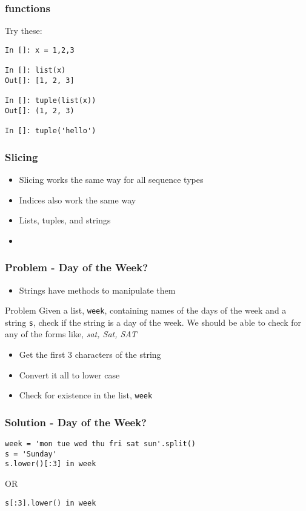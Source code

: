 \documentclass[14pt,compress]{beamer}
\begin{document}
\begin{frame}[fragile]
  \frametitle{ functions}
  Try these:
\begin{lstlisting}
In []: x = 1,2,3

In []: list(x)
Out[]: [1, 2, 3]

In []: tuple(list(x))
Out[]: (1, 2, 3)

In []: tuple('hello')
\end{lstlisting}
\end{frame}

\begin{frame}
  \frametitle{Slicing}
  \begin{itemize}
  \item Slicing works the same way for all sequence types
  \item Indices also work the same way
  \item Lists, tuples, and strings
  \item \alert{}
  \end{itemize}
\end{frame}

\begin{frame}
  \frametitle{Problem - Day of the Week?}
  \begin{itemize}
  \item Strings have methods to manipulate them
  \end{itemize}
  \begin{block}{Problem}
    Given a list, \texttt{week}, containing names of the days of the
    week and a string \texttt{s}, check if the string is a day of the
    week. We should be able to check for any of the forms like,
    \emph{sat, Sat, SAT}
  \end{block}
  \begin{itemize}
  \item Get the first 3 characters of the string
  \item Convert it all to lower case
  \item Check for existence in the list, \texttt{week}
  \end{itemize}
\end{frame}

\begin{frame}[fragile]
  \frametitle{Solution - Day of the Week?}
  \small
\begin{lstlisting}
week = 'mon tue wed thu fri sat sun'.split()
s = 'Sunday'
s.lower()[:3] in week
\end{lstlisting}
  OR
\begin{lstlisting}
s[:3].lower() in week
\end{lstlisting}
\end{frame}
\end{document}
